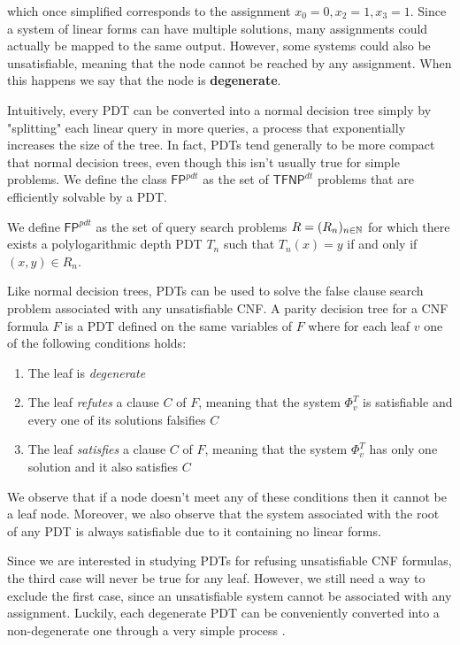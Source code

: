 which once simplified corresponds to the assignment $x_0 = 0, x_2 = 1, x_3 = 1$. Since a system of linear forms can have multiple solutions, many assignments could actually be mapped to the same output. However, some systems could also be unsatisfiable, meaning that the node cannot be reached by any assignment. When this happens we say that the node is \textbf{degenerate}.

Intuitively, every PDT can be converted into a normal decision tree simply by "splitting" each linear query in more queries, a process that exponentially increases the size of the tree. In fact, PDTs tend generally to be more compact that normal decision trees, even though this isn't usually true for simple problems. We define the class $\mathsf{FP}^{pdt}$ as the set of $\mathsf{TFNP}^{dt}$ problems that are efficiently solvable by a PDT.

\begin{definition}
    We define $\mathsf{FP}^{pdt}$ as the set of query search problems $R = (R_n)_{n \in \mathbb{N}}$ for which there exists a polylogarithmic depth PDT $T_n$ such that $T_n(x) = y$ if and only if $(x,y) \in R_n$.
\end{definition}

\newpage

Like normal decision trees, PDTs can be used to solve the false clause search problem associated with any unsatisfiable CNF. A parity decision tree for a CNF formula $F$ is a PDT defined on the same variables of $F$ where for each leaf $v$ one of the following conditions holds:
\begin{enumerate}[itemsep=0em]
    \item The leaf is \textit{degenerate}
    \item The leaf \textit{refutes} a clause $C$ of $F$, meaning that the system $\Phi_v^T$ is satisfiable and every one of its solutions falsifies $C$
    \item The leaf \textit{satisfies} a clause $C$ of $F$, meaning that the system $\Phi_v^T$ has only one solution and it also satisfies $C$
\end{enumerate}

We observe that if a node doesn't meet any of these conditions then it cannot be a leaf node. Moreover, we also observe that the system associated with the root of any PDT is always satisfiable due to it containing no linear forms.

Since we are interested in studying PDTs for refusing unsatisfiable CNF formulas, the third case will never be true for any leaf. However, we still need a way to exclude the first case, since an unsatisfiable system cannot be associated with any assignment. Luckily, each degenerate PDT can be conveniently converted into a non-degenerate one through a very simple process \cite{res_lin_2}.

